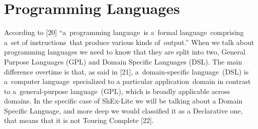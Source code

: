 \section{Programming Languages}
According to [20] “a programming language is a formal language comprising a set of instructions that produce various kinds of output.” When we talk about programming languages we need to know that they are split into two, General Purpose Languages (GPL) and Domain Specific Languages (DSL). The main difference overtime is that, as said in [21], a domain-specific language (DSL) is a computer language specialized to a particular application domain in contrast to a general-purpose language (GPL), which is broadly applicable across domains.
In the specific case of ShEx-Lite we will be talking about a Domain Specific Language, and more deep we would classified it as a Declarative one, that means that it is not Touring Complete [22].
